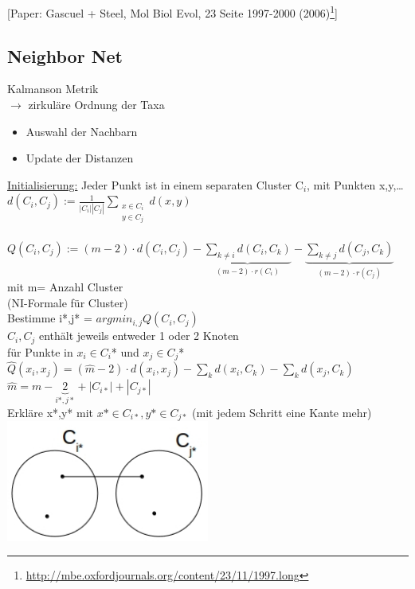 [Paper: Gascuel + Steel, Mol Biol Evol, 23 Seite 1997-2000 (2006)\footnote{\url{http://mbe.oxfordjournals.org/content/23/11/1997.long}}]
\\
\subsection{Neighbor Net}
Kalmanson Metrik\\
$\rightarrow$ zirkuläre Ordnung der Taxa\\
\begin{itemize}
	\item Auswahl der Nachbarn
	\item Update der Distanzen
\end{itemize}

\underline{Initialisierung:} Jeder Punkt ist in einem separaten Cluster C$_i$, mit Punkten x,y,…\\
$d(C_i,C_j):=\frac{1}{|C_i||C_j|} \displaystyle \sum_{\substack{x \in C_i \\ y \in C_j}}d(x,y)$\\
\\
$Q(C_i,C_j):=(m-2) \cdot d(C_i,C_j) - \displaystyle \underbrace{\sum_{k \neq i} d(C_i,C_k)}_{(m-2) \cdot r(C_i)} - \displaystyle \underbrace{\sum_{k \neq j} d(C_j,C_k)}_{(m-2) \cdot r(C_j)}$\\
mit m= Anzahl Cluster\\
(NI-Formale für Cluster)\\
Bestimme i*,j* = $argmin_{i,j} Q(C_i,C_j)$\\
$C_i,C_j$ enthält jeweils entweder 1 oder 2 Knoten\\
für Punkte in $x_i \in C_i$* und $x_j \in C_j$*\\
$\hat Q(x_i,x_j)=(\hat m -2) \cdot d(x_i,x_j) - \displaystyle \sum_{k} d(x_i,C_k) - \displaystyle \sum_{k} d(x_j,C_k)$\\
$\hat m = m - \underbrace{2}_{i*,j*} + |C_{i*}| + |C_{j*}|$\\
Erkläre x*,y* mit $x* \in C_{i*}, y* \in C_{j*}$ (mit jedem Schritt eine Kante mehr)
\includegraphics[width=0.5\textwidth]{lectures/161221/pix/4.jpg}\\
